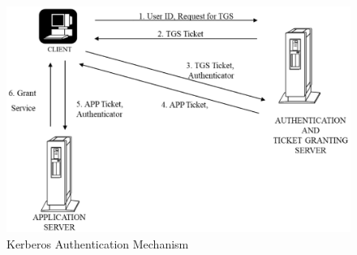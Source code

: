 \begin{figure}[!ht]
\centering
\includegraphics[scale=.82]{src/Figures/chap2/3.eps}
\caption{Kerberos Authentication Mechanism}\label{chap2-fig3}
\end{figure}

